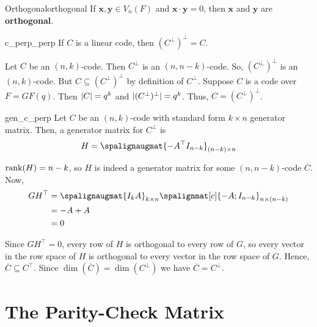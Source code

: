 
\begin{Definition}{Orthogonal}{orthogonal}
    If $ \symbf{x},\symbf{y}\in V_n(F) $ and $ \symbf{x}\cdot \symbf{y}=0 $, then
    $ \symbf{x} $ and $ \symbf{y} $ are \textbf{orthogonal}.
\end{Definition}

\begin{Theorem}{}{c_perp_perp}
    If $ C $ is a linear code, then $ (C^{\perp})^{\perp}=C $.
\end{Theorem}

\begin{Proof}{}{}
    Let $ C $ be an $ (n,k) $-code. Then $ C^{\perp} $ is an $ (n,n-k) $-code.
    So, $ (C^{\perp})^{\perp} $ is an $ (n,k) $-code. But
    $ C\subseteq (C^{\perp})^{\perp} $ by definition of $ C^{\perp} $.
    Suppose $ C $ is a code over $ F=GF(q) $. Then $ \lvert C\rvert=q^k $
    and $ \lvert(C^{\perp})^{\perp}\rvert=q^k $. Thus, $ C=(C^{\perp})^{\perp} $.
\end{Proof}

\begin{Theorem}{}{gen_c_perp}
    Let $ C $ be an $ (n,k) $-code with standard form $ k\times n $ generator matrix.
    Then, a generator matrix for $ C^{\perp} $ is
    \[ H=\spalignaugmat{-A^{\top} I_{n-k}}_{(n-k)\times n} \]
\end{Theorem}

\begin{Proof}{}{}
    $ \operatorname{rank}(H)=n-k $, so $ H $ is indeed a generator matrix for some $ (n,n-k) $-code
    $ \overline{C} $. Now,
    \begin{align*}
        GH^{\top}
         & = \spalignaugmat{I_k A}_{k\times n}\spalignmat[c]{-A; I_{n-k}}_{n\times(n-k)} \\
         & =-A+A                                                                         \\
         & =0
    \end{align*}

    Since $ GH^{\top}=0 $, every row of $ H $ is orthogonal to every row of $ G $,
    so every vector in the row space of $ H $ is orthogonal to every vector in
    the row space of $ G $. Hence, $ \overline{C}\subseteq C^\top $. Since
    $ \dim(\overline{C})=\dim(C^{\perp}) $ we have $ \overline{C}=C^{\perp} $.
\end{Proof}

\section{The Parity-Check Matrix}

